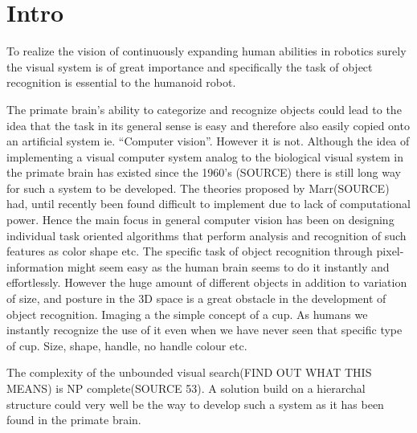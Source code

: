 \section{Intro}

To realize the vision of continuously expanding human abilities in robotics surely the visual system is of great importance and specifically the task of object recognition is essential to the humanoid robot.

The primate brain's ability to categorize and recognize objects could lead to the idea that the task in its general sense is easy and therefore also easily copied onto an artificial system ie. “Computer vision”. However it is not.
Although the idea of implementing a visual computer system analog to the biological visual system in the primate brain has existed since the 1960's (SOURCE) there is still long way for such a system to be developed. The theories proposed by Marr(SOURCE) had, until recently been found difficult to implement due to lack of computational power. Hence the main focus in general computer vision has been on designing individual task oriented algorithms that perform analysis and recognition of such features as color shape etc.
The specific task of object recognition through pixel-information might seem easy as the human brain seems to do it instantly and effortlessly. However the huge amount of different objects in addition to variation of size, and posture in the 3D space is a great obstacle in the development of object recognition. Imaging a the simple concept of a cup. As humans we instantly recognize the use of it even when we have never seen that specific type of cup. Size, shape, handle, no handle colour etc.

The complexity of the unbounded visual search(FIND OUT WHAT THIS MEANS) is NP complete(SOURCE 53).  A solution build on a hierarchal structure could very well be the way to develop such a system as it has been found in the primate brain.

